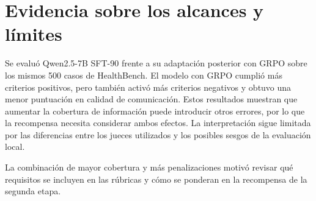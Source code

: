 \section{Evidencia sobre los alcances y límites}
\label{sec:contribuciones-evidencia}

Se evaluó Qwen2.5-7B SFT-90 frente a su adaptación posterior con GRPO sobre los mismos 500 casos de HealthBench. El modelo con GRPO cumplió más criterios positivos, pero también activó más criterios negativos y obtuvo una menor puntuación en calidad de comunicación. Estos resultados muestran que aumentar la cobertura de información puede introducir otros errores, por lo que la recompensa necesita considerar ambos efectos. La interpretación sigue limitada por las diferencias entre los jueces utilizados y los posibles sesgos de la evaluación local.

La combinación de mayor cobertura y más penalizaciones motivó revisar qué requisitos se incluyen en las rúbricas y cómo se ponderan en la recompensa de la segunda etapa.
